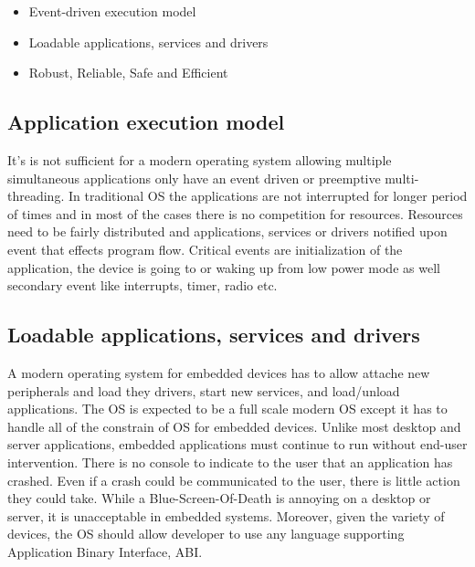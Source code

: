\begin{itemize}
  \item Event-driven execution model
  \item Loadable applications, services and drivers
  \item Robust, Reliable, Safe and Efficient 
\end{itemize}



\subsection{Application execution model}
It's is not sufficient for a modern operating system allowing multiple
simultaneous applications only have an event driven or preemptive
multi-threading. In traditional OS the applications are not interrupted for
longer period of times and in most of the cases there is no competition for
resources. Resources need to be fairly distributed and applications, services or
drivers notified upon event that effects program flow. Critical events are
initialization of the application, the device is going to or waking up from low
power mode as well secondary event like interrupts, timer, radio etc.

\subsection{Loadable applications, services and drivers}
A modern operating system for embedded devices has to allow attache new
peripherals and load they drivers, start new services, and load/unload
applications. The OS is expected to be a full scale modern OS except it has to
handle all of the constrain of OS for embedded devices. Unlike most desktop and
server applications, embedded applications must continue to run without end-user
intervention. There is no console to indicate to the user that an application
has crashed. Even if a crash could be communicated to the user, there is little
action they could take. While a Blue-Screen-Of-Death is annoying on a desktop or
server, it is unacceptable in embedded systems. Moreover, given the variety of
devices, the OS should allow developer to use any language supporting
Application Binary Interface, ABI.


